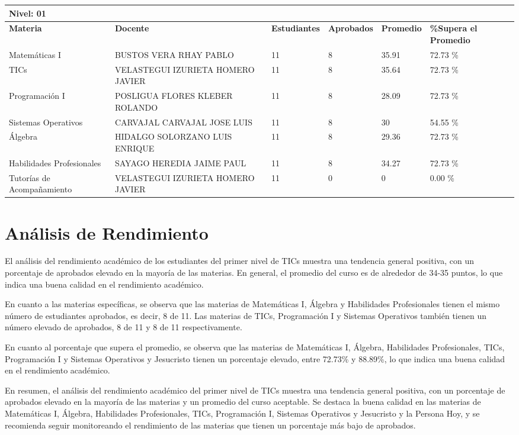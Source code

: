 \small
\begin{tabularx}{\textwidth}{|p{2.5cm}|p{2.5cm}|X|X|X|X|}
\hline
\multicolumn{6}{|X|}{\textbf{Nivel: 01 }}\\\hline\textbf{Materia} & \textbf{Docente} & \textbf{Estudiantes} & \textbf{Aprobados} & \textbf{Promedio} & \textbf{\%Supera el Promedio} \\ \hline
Matemáticas I & BUSTOS VERA RHAY PABLO & 11 & 8 & 35.91 & 72.73 \%\\ \hline
TICs & VELASTEGUI IZURIETA HOMERO JAVIER & 11 & 8 & 35.64 & 72.73 \%\\ \hline
Programación I & POSLIGUA FLORES KLEBER ROLANDO & 11 & 8 & 28.09 & 72.73 \%\\ \hline
Sistemas Operativos & CARVAJAL CARVAJAL JOSE LUIS & 11 & 8 & 30 & 54.55 \%\\ \hline
Álgebra & HIDALGO SOLORZANO LUIS ENRIQUE & 11 & 8 & 29.36 & 72.73 \%\\ \hline
Habilidades Profesionales & SAYAGO HEREDIA JAIME PAUL & 11 & 8 & 34.27 & 72.73 \%\\ \hline
Tutorías de Acompañamiento & VELASTEGUI IZURIETA HOMERO JAVIER & 11 & 0 & 0 & 0.00 \%\\ \hline
\end{tabularx}

\vspace{1cm}
\section{Análisis de Rendimiento}
El análisis del rendimiento académico de los estudiantes del primer nivel de TICs muestra una tendencia general positiva, con un porcentaje de aprobados elevado en la mayoría de las materias. En general, el promedio del curso es de alrededor de 34-35 puntos, lo que indica una buena calidad en el rendimiento académico.

En cuanto a las materias específicas, se observa que las materias de Matemáticas I, Álgebra y Habilidades Profesionales tienen el mismo número de estudiantes aprobados, es decir, 8 de 11. Las materias de TICs, Programación I y Sistemas Operativos también tienen un número elevado de aprobados, 8 de 11 y 8 de 11 respectivamente.

En cuanto al porcentaje que supera el promedio, se observa que las materias de Matemáticas I, Álgebra, Habilidades Profesionales, TICs, Programación I y Sistemas Operativos y Jesucristo tienen un porcentaje elevado, entre 72.73\% y 88.89\%, lo que indica una buena calidad en el rendimiento académico.

En resumen, el análisis del rendimiento académico del primer nivel de TICs muestra una tendencia general positiva, con un porcentaje de aprobados elevado en la mayoría de las materias y un promedio del curso aceptable. Se destaca la buena calidad en las materias de Matemáticas I, Álgebra, Habilidades Profesionales, TICs, Programación I, Sistemas Operativos y Jesucristo y la Persona Hoy, y se recomienda seguir monitoreando el rendimiento de las materias que tienen un porcentaje más bajo de aprobados.\\
\vspace{1cm}

